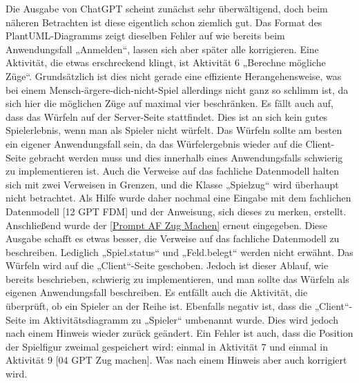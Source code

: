 Die Ausgabe von ChatGPT scheint zunächst sehr überwältigend, doch beim näheren Betrachten ist diese eigentlich schon ziemlich gut. Das 
Format des PlantUML-Diagramms zeigt dieselben Fehler auf wie bereits beim Anwendungsfall „Anmelden“, lassen sich aber später alle 
korrigieren. Eine Aktivität, die etwas erschreckend klingt, ist Aktivität 6 „Berechne mögliche Züge“. Grundsätzlich ist dies nicht 
gerade eine effiziente Herangehensweise, was bei einem Mensch-ärgere-dich-nicht-Spiel allerdings nicht ganz so schlimm ist, da sich 
hier die möglichen Züge auf maximal vier beschränken. Es fällt auch auf, dass das Würfeln auf der Server-Seite stattfindet. Dies ist 
an sich kein gutes Spielerlebnis, wenn man als Spieler nicht würfelt. Das Würfeln sollte am besten ein eigener Anwendungsfall sein, da 
das Würfelergebnis wieder auf die Client-Seite gebracht werden muss und dies innerhalb eines Anwendungsfalls schwierig zu implementieren 
ist. Auch die Verweise auf das fachliche Datenmodell halten sich mit zwei Verweisen in Grenzen, und die Klasse „Spielzug“ wird überhaupt 
nicht betrachtet. Als Hilfe wurde daher nochmal eine Eingabe mit dem fachlichen Datenmodell [12 GPT FDM] und der Anweisung, sich dieses 
zu merken, erstellt. Anschließend wurde der \autoref{Prompt AF Zug Machen} erneut eingegeben. Diese Ausgabe schafft es etwas besser, 
die Verweise auf das fachliche Datenmodell zu beschreiben. Lediglich „Spiel.status“ und „Feld.belegt“ werden nicht erwähnt. Das Würfeln 
wird auf die „Client“-Seite geschoben. Jedoch ist dieser Ablauf, wie bereits beschrieben, schwierig zu implementieren, und man sollte das 
Würfeln als eigenen Anwendungsfall beschreiben. Es entfällt auch die Aktivität, die überprüft, ob ein Spieler an der Reihe ist. Ebenfalls 
negativ ist, dass die „Client“-Seite im Aktivitätsdiagramm zu „Spieler“ umbenannt wurde. Dies wird jedoch nach einem Hinweis wieder zurück 
geändert. Ein Fehler ist auch, dass die Position der Spielfigur zweimal gespeichert wird: einmal in Aktivität 7 und einmal in Aktivität 9 
[04 GPT Zug machen]. Was nach einem Hinweis aber auch korrigiert wird.

